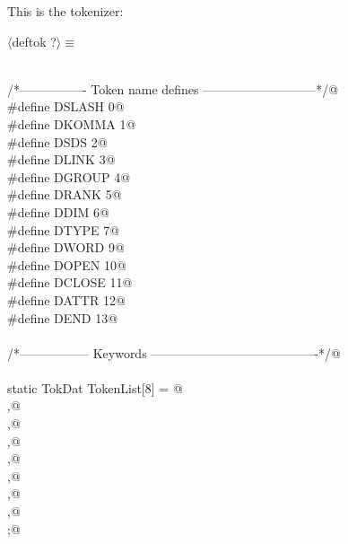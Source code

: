\documentclass[12pt]{article}
\begin{document}
This is the tokenizer:
\begin{flushleft} \small
\begin{minipage}{\linewidth} \label{scrap18}
$\langle$deftok {\footnotesize ?}$\rangle\equiv$
\vspace{-1ex}
\begin{list}{}{} \item
\mbox{}\verb@@\\
\mbox{}\verb@/*---------------- Token name defines ---------------------------*/@\\
\mbox{}\verb@#define DSLASH 0@\\
\mbox{}\verb@#define DKOMMA 1@\\
\mbox{}\verb@#define DSDS   2@\\
\mbox{}\verb@#define DLINK  3@\\
\mbox{}\verb@#define DGROUP 4@\\
\mbox{}\verb@#define DRANK  5@\\
\mbox{}\verb@#define DDIM   6@\\
\mbox{}\verb@#define DTYPE  7@\\
\mbox{}\verb@#define DWORD  9@\\
\mbox{}\verb@#define DOPEN  10@\\
\mbox{}\verb@#define DCLOSE 11@\\
\mbox{}\verb@#define DATTR  12@\\
\mbox{}\verb@#define DEND   13@\\
\mbox{}\verb@@\\
\mbox{}\verb@/*----------------- Keywords ----------------------------------------*/@\\
\mbox{}\verb@@\\
\mbox{}\verb@  static TokDat TokenList[8] = { @\\
\mbox{},@\\
\mbox{},@\\
\mbox{},@\\
\mbox{},@\\
\mbox{},@\\
\mbox{},@\\
\mbox{},@\\
\mbox{} };@\\

\end{list}
\end{minipage}
\end{flushleft}
\end{document}
